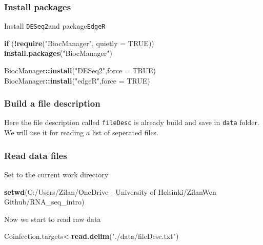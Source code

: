 \documentclass[
]{article}
\newenvironment{Shaded}{\begin{snugshade}}{\end{snugshade}}
\newcommand{\AttributeTok}[1]{\textcolor[rgb]{0.13,0.29,0.53}{#1}}
\newcommand{\ConstantTok}[1]{\textcolor[rgb]{0.56,0.35,0.01}{#1}}
\newcommand{\ControlFlowTok}[1]{\textcolor[rgb]{0.13,0.29,0.53}{\textbf{#1}}}
\newcommand{\FunctionTok}[1]{\textcolor[rgb]{0.13,0.29,0.53}{\textbf{#1}}}
\newcommand{\NormalTok}[1]{#1}
\newcommand{\OtherTok}[1]{\textcolor[rgb]{0.56,0.35,0.01}{#1}}
\newcommand{\SpecialCharTok}[1]{\textcolor[rgb]{0.81,0.36,0.00}{\textbf{#1}}}
\newcommand{\StringTok}[1]{\textcolor[rgb]{0.31,0.60,0.02}{#1}}
\begin{document}
\subsubsection{Install packages}\label{install-packages}

Install \texttt{DESeq2}and package\texttt{EdgeR}

\begin{Shaded}
\begin{Highlighting}[]
\ControlFlowTok{if}\NormalTok{ (}\SpecialCharTok{!}\FunctionTok{require}\NormalTok{(}\StringTok{"BiocManager"}\NormalTok{, }\AttributeTok{quietly =} \ConstantTok{TRUE}\NormalTok{))}
    \FunctionTok{install.packages}\NormalTok{(}\StringTok{"BiocManager"}\NormalTok{)}

\NormalTok{BiocManager}\SpecialCharTok{::}\FunctionTok{install}\NormalTok{(}\StringTok{"DESeq2"}\NormalTok{,}\AttributeTok{force =} \ConstantTok{TRUE}\NormalTok{)}
\NormalTok{BiocManager}\SpecialCharTok{::}\FunctionTok{install}\NormalTok{(}\StringTok{"edgeR"}\NormalTok{,}\AttributeTok{force =} \ConstantTok{TRUE}\NormalTok{)}
\end{Highlighting}
\end{Shaded}

\subsubsection{Build a file description}\label{build-a-file-description}

Here the file description called \texttt{fileDesc} is already build and
save in \texttt{data} folder. We will use it for reading a list of
seperated files.

\subsubsection{Read data files}\label{read-data-files}

Set to the current work directory

\begin{Shaded}
\begin{Highlighting}[]
\FunctionTok{setwd}\NormalTok{(}\StringTok{\textquotesingle{}C:/Users/Zilan/OneDrive {-} University of Helsinki/ZilanWen Github/RNA\_seq\_intro\textquotesingle{}}\NormalTok{)}
\end{Highlighting}
\end{Shaded}

Now we start to read raw data

\begin{Shaded}
\begin{Highlighting}[]
\NormalTok{Coinfection.targets}\OtherTok{\textless{}{-}}\FunctionTok{read.delim}\NormalTok{(}\StringTok{"./data/fileDesc.txt"}\NormalTok{)}
\end{Highlighting}
\end{Shaded}
\end{document}
